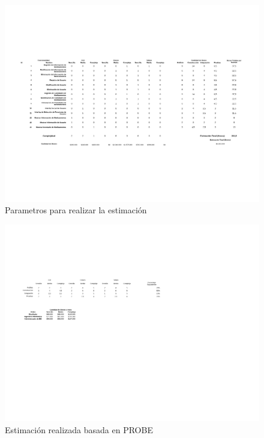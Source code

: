 \begin{figure}[htb]
	\centering
	\includegraphics[width=1.2\linewidth]{capitulo4/img/PROBE.png}
	\caption{Parametros para realizar la estimaci\'on}
\end{figure}

\begin{figure}[htb]
	\centering
	\includegraphics[width=1.2\linewidth]{capitulo4/img/PROBE_2.png}
	\caption{Estimaci\'on realizada basada en PROBE}
\end{figure}
\newpage
